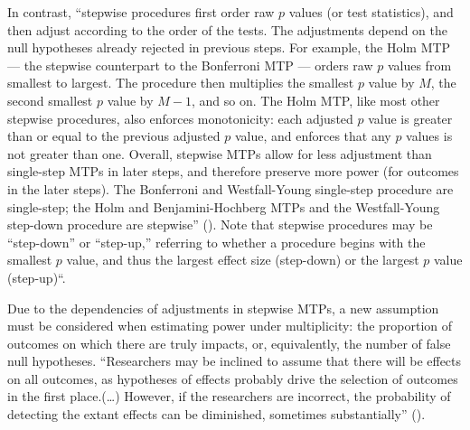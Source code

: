 \documentclass[
]{jss}
\begin{document}
In contrast, ``stepwise procedures first order raw \(p\) values (or test
statistics), and then adjust according to the order of the tests. The
adjustments depend on the null hypotheses already rejected in previous
steps. For example, the Holm MTP --- the stepwise counterpart to the
Bonferroni MTP --- orders raw \(p\) values from smallest to largest. The
procedure then multiplies the smallest \(p\) value by \(M\), the second
smallest \(p\) value by \(M-1\), and so on. The Holm MTP, like most
other stepwise procedures, also enforces monotonicity: each adjusted
\(p\) value is greater than or equal to the previous adjusted \(p\)
value, and enforces that any \(p\) values is not greater than one.
Overall, stepwise MTPs allow for less adjustment than single-step MTPs
in later steps, and therefore preserve more power (for outcomes in the
later steps). The Bonferroni and Westfall-Young single-step procedure
are single-step; the Holm and Benjamini-Hochberg MTPs and the
Westfall-Young step-down procedure are stepwise'' (\citet{Porter2018}).
Note that stepwise procedures may be ``step-down'' or ``step-up,''
referring to whether a procedure begins with the smallest \(p\) value,
and thus the largest effect size (step-down) or the largest \(p\) value
(step-up)``.

Due to the dependencies of adjustments in stepwise MTPs, a new
assumption must be considered when estimating power under multiplicity:
the proportion of outcomes on which there are truly impacts, or,
equivalently, the number of false null hypotheses. ``Researchers may be
inclined to assume that there will be effects on all outcomes, as
hypotheses of effects probably drive the selection of outcomes in the
first place.(\ldots) However, if the researchers are incorrect, the
probability of detecting the extant effects can be diminished, sometimes
substantially'' (\citet{Porter2018}).
\end{document}
